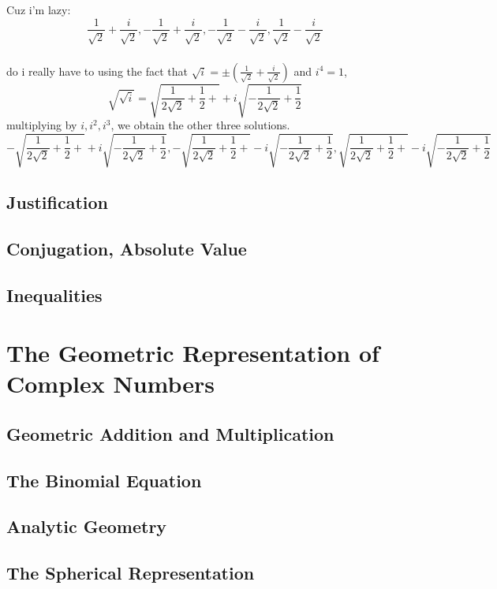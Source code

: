 \subsubsection{}
Cuz i'm lazy:
\[\frac{1}{\sqrt{2}}+\frac{i}{\sqrt{2}},-\frac{1}{\sqrt{2}}+\frac{i}{\sqrt{2}},-\frac{1}{\sqrt{2}}-\frac{i}{\sqrt{2}},\frac{1}{\sqrt{2}}-\frac{i}{\sqrt{2}}\]
\subsubsection{}
do i really have to
using the fact that \(\sqrt{i} = \pm\left(\frac{1}{\sqrt{2}}+\frac{i}{\sqrt{2}}\right)\) and \(i^4=1\),
\[\sqrt{\sqrt{i}}=\sqrt{\frac{1}{2\sqrt{2}}+\frac{1}{2}+}+i\sqrt{-\frac{1}{2\sqrt{2}}+\frac{1}{2}}\]
multiplying by \(i,i^2,i^3\), we obtain the other three solutions.
\hfuzz=10pt
\[-\sqrt{\frac{1}{2\sqrt{2}}+\frac{1}{2}+}+i\sqrt{-\frac{1}{2\sqrt{2}}+\frac{1}{2}},-\sqrt{\frac{1}{2\sqrt{2}}+\frac{1}{2}+}-i\sqrt{-\frac{1}{2\sqrt{2}}+\frac{1}{2}},\sqrt{\frac{1}{2\sqrt{2}}+\frac{1}{2}+}-i\sqrt{-\frac{1}{2\sqrt{2}}+\frac{1}{2}}\]



\subsection{Justification}
\subsection{Conjugation, Absolute Value}
\subsection{Inequalities}
\section{The Geometric Representation of Complex Numbers}
\subsection{Geometric Addition and Multiplication}
\subsection{The Binomial Equation}
\subsection{Analytic Geometry}
\subsection{The Spherical Representation}
